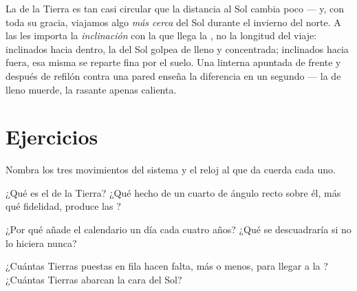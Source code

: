 \begin{remark}\label{rem:g6:sun-earth-moon:notdistance}
La  de la Tierra es tan casi circular que la distancia al
Sol cambia poco --- y, con toda su gracia, viajamos algo \emph{más
cerca} del Sol durante el invierno del norte. A las  les
importa la \emph{inclinación} con la que llega la , no la
longitud del viaje: inclinados hacia dentro, la  del Sol golpea de
lleno y concentrada; inclinados hacia fuera, esa misma  se
reparte fina por el suelo. Una linterna apuntada de frente y después
de refilón contra una pared enseña la diferencia en un segundo --- la
 de lleno muerde, la  rasante apenas calienta.
\end{remark}

\section{Ejercicios}

\begin{exercise}[$\star$]\label{exo:g6:sun-earth-moon:1}
Nombra los tres movimientos del sistema y el reloj al que da cuerda
cada uno.
\end{exercise}

\begin{exercise}[$\star$]\label{exo:g6:sun-earth-moon:2}
¿Qué es el  de la Tierra? ¿Qué hecho de un cuarto de ángulo
recto sobre él, más qué fidelidad, produce las ?
\end{exercise}

\begin{exercise}[$\star$]\label{exo:g6:sun-earth-moon:3}
¿Por qué añade el calendario un día cada cuatro años? ¿Qué se
descuadraría si no lo hiciera nunca?
\end{exercise}

\begin{exercise}[$\star$]\label{exo:g6:sun-earth-moon:4}
¿Cuántas Tierras puestas en fila hacen falta, más o menos, para llegar
a la ? ¿Cuántas Tierras abarcan la cara del Sol?
\end{exercise}


